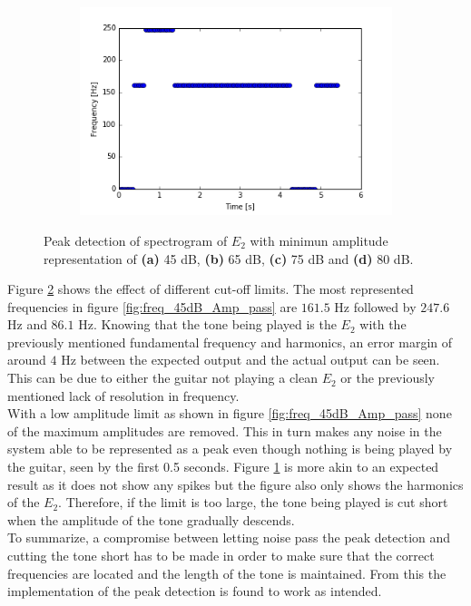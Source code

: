 \begin{figure}[H]
\begin{subfigure}{0.49\textwidth}
\includegraphics[width=\textwidth]{figures/peak_detection/peak_lim4.png}
\caption{}
\label{fig:freq_80dB_Amp_pass}

\end{subfigure}
\caption{Peak detection of spectrogram of $E_2$ with minimun amplitude representation of \textbf{(a)} 45 dB, \textbf{(b)} 65 dB, \textbf{(c)} 75 dB and \textbf{(d)} 80 dB.}
\label{fig:valdation_peak_detection}
\end{figure}
Figure \ref{fig:valdation_peak_detection} shows the effect of different cut-off limits. The most represented frequencies in figure \ref{fig:freq_45dB_Amp_pass} are $161.5$ Hz followed by $247.6$ Hz and $86.1$ Hz. 
Knowing that the tone being played is the $E_2$ with the previously mentioned fundamental frequency and harmonics, an error margin of around $4$ Hz between the expected output and the actual output can be seen. This can be due to either the guitar not playing a clean $E_2$ or the previously mentioned lack of resolution in frequency.
\\
With a low amplitude limit as shown in figure \ref{fig:freq_45dB_Amp_pass} none of the maximum amplitudes are removed. This in turn makes any noise in the system able to be represented as a peak even though nothing is being played by the guitar, seen by the first 0.5 seconds.
Figure \ref{fig:freq_80dB_Amp_pass} is more akin to an expected result as it does not show any spikes but the figure also only shows the harmonics of the $E_2$. Therefore, if the limit is too large, the tone being played is cut short when the amplitude of the tone gradually descends.
\\
To summarize, a compromise between letting noise pass the peak detection and cutting the tone short has to be made in order to make sure that the correct frequencies are located and the length of the tone is maintained. From this the implementation of the peak detection is found to work as intended.